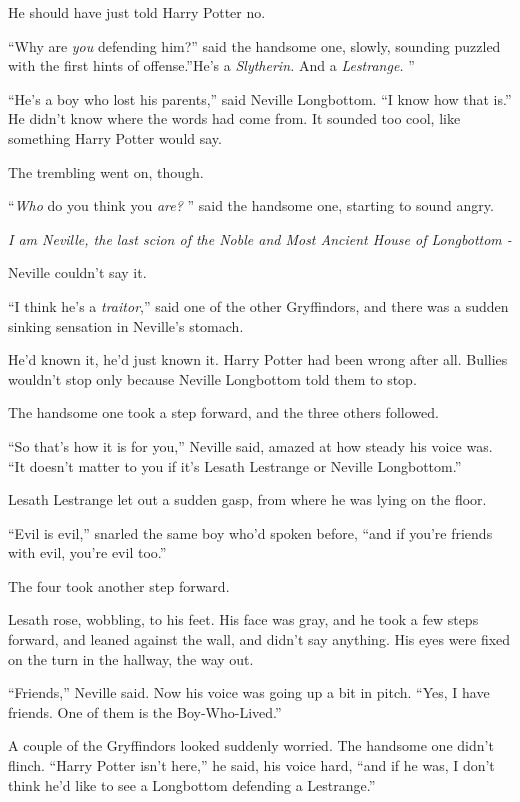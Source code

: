 He should have just told Harry Potter no.

``Why are \emph{you} defending him?'' said the handsome one, slowly,
sounding puzzled with the first hints of offense.''He's a
\emph{Slytherin.} And a \emph{Lestrange.} ''

``He's a boy who lost his parents,'' said Neville Longbottom. ``I know
how that is.'' He didn't know where the words had come from. It sounded
too cool, like something Harry Potter would say.

The trembling went on, though.

``\emph{Who} do you think you \emph{are?} '' said the handsome one,
starting to sound angry.

\emph{I am Neville, the last scion of the Noble and Most Ancient House
of Longbottom -}

Neville couldn't say it.

``I think he's a \emph{traitor},'' said one of the other Gryffindors, and
there was a sudden sinking sensation in Neville's stomach.

He'd known it, he'd just known it. Harry Potter had been wrong after
all. Bullies wouldn't stop only because Neville Longbottom told them to
stop.

The handsome one took a step forward, and the three others followed.

``So that's how it is for you,'' Neville said, amazed at how steady his
voice was. ``It doesn't matter to you if it's Lesath Lestrange or
Neville Longbottom.''

Lesath Lestrange let out a sudden gasp, from where he was lying on the
floor.

``Evil is evil,'' snarled the same boy who'd spoken before, ``and if
you're friends with evil, you're evil too.''

The four took another step forward.

Lesath rose, wobbling, to his feet. His face was gray, and he took a few
steps forward, and leaned against the wall, and didn't say anything. His
eyes were fixed on the turn in the hallway, the way out.

``Friends,'' Neville said. Now his voice was going up a bit in pitch.
``Yes, I have friends. One of them is the Boy-Who-Lived.''

A couple of the Gryffindors looked suddenly worried. The handsome one
didn't flinch. ``Harry Potter isn't here,'' he said, his voice hard,
``and if he was, I don't think he'd like to see a Longbottom defending a
Lestrange.''

